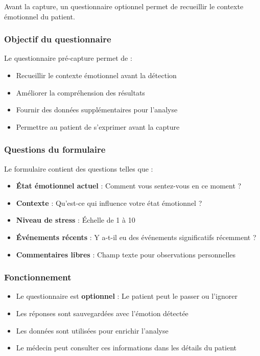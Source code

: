 \documentclass[a4paper,11pt]{report}
\begin{document}
Avant la capture, un questionnaire optionnel permet de recueillir le contexte émotionnel du patient.

\subsubsection{Objectif du questionnaire}

Le questionnaire pré-capture permet de :
\begin{itemize}
    \item Recueillir le contexte émotionnel avant la détection
    \item Améliorer la compréhension des résultats
    \item Fournir des données supplémentaires pour l'analyse
    \item Permettre au patient de s'exprimer avant la capture
\end{itemize}

\subsubsection{Questions du formulaire}

Le formulaire contient des questions telles que :
\begin{itemize}
    \item \textbf{État émotionnel actuel} : Comment vous sentez-vous en ce moment ?
    \item \textbf{Contexte} : Qu'est-ce qui influence votre état émotionnel ?
    \item \textbf{Niveau de stress} : Échelle de 1 à 10
    \item \textbf{Événements récents} : Y a-t-il eu des événements significatifs récemment ?
    \item \textbf{Commentaires libres} : Champ texte pour observations personnelles
\end{itemize}

\subsubsection{Fonctionnement}

\begin{itemize}
    \item Le questionnaire est \textbf{optionnel} : Le patient peut le passer ou l'ignorer
    \item Les réponses sont sauvegardées avec l'émotion détectée
    \item Les données sont utilisées pour enrichir l'analyse
    \item Le médecin peut consulter ces informations dans les détails du patient
\end{itemize}
\end{document}

